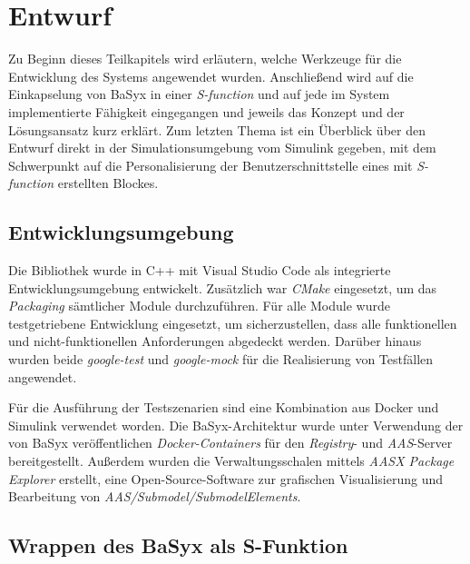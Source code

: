 \section{Entwurf} \label{Entwurf}


Zu Beginn dieses Teilkapitels wird erläutern, welche Werkzeuge für die Entwicklung des Systems angewendet wurden. Anschließend wird auf die Einkapselung von BaSyx in einer \textit{S-function} und auf jede im System implementierte Fähigkeit eingegangen und jeweils das Konzept und der Lösungsansatz kurz erklärt. Zum letzten Thema ist ein Überblick über den Entwurf direkt in der Simulationsumgebung vom Simulink gegeben, mit dem Schwerpunkt auf die Personalisierung der Benutzerschnittstelle eines mit \textit{S-function} erstellten Blockes.


\subsection{Entwicklungsumgebung}

Die Bibliothek wurde in C++ mit Visual Studio Code als integrierte Entwicklungsumgebung entwickelt. Zusätzlich war \textit{CMake} eingesetzt, um das \textit{Packaging} sämtlicher Module durchzuführen. Für alle Module wurde testgetriebene Entwicklung eingesetzt, um sicherzustellen, dass alle funktionellen  und nicht-funktionellen Anforderungen abgedeckt werden. Darüber hinaus wurden beide \textit{google-test} und \textit{google-mock }für die Realisierung von Testfällen angewendet.


Für die Ausführung der Testszenarien sind eine Kombination aus Docker und Simulink verwendet worden. Die BaSyx-Architektur wurde unter Verwendung der von BaSyx veröffentlichen \textit{Docker-Containers} für den \textit{Registry}- und \textit{AAS}-Server bereitgestellt. Außerdem wurden die Verwaltungsschalen mittels \textit{AASX Package Explorer} erstellt, eine Open-Source-Software zur grafischen Visualisierung und Bearbeitung von \textit{AAS/Submodel/SubmodelElements}.
\subsection{Wrappen des BaSyx als S-Funktion}


